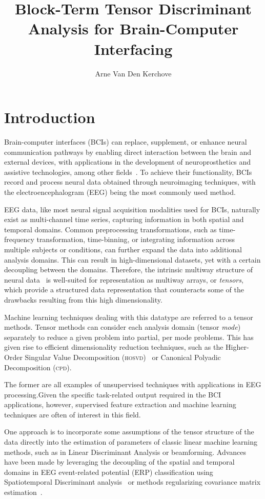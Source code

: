 \documentclass[twocolumn]{article}
\title{Block-Term Tensor Discriminant Analysis for Brain-Computer Interfacing}
\author{Arne Van Den Kerchove}
\begin{document}
\maketitle

\section{Introduction}
Brain-computer interfaces (BCIs) can replace, supplement, or enhance neural
communication pathways by enabling direct interaction between the brain and
external devices, with applications in the development of neuroprosthetics and
assistive technologies, among other fields~\cite{NicolasAlonso2012}.
To achieve their functionality, BCIs record and process neural data obtained
through neuroimaging techniques, with the electroencephalogram (EEG) being the
most commonly used method.

EEG data, like most neural signal acquisition modalities used for BCIs,
naturally exist as multi-channel time series, capturing information in both
spatial and temporal domains.
Common preprocessing transformations, such as time-frequency transformation,
time-binning, or integrating information across multiple subjects or conditions,
can further expand the data into additional analysis domains.
This can result in high-dimensional datasets, yet with a certain decoupling
between the domains.
Therefore, the intrinsic multiway structure of neural data~\cite{Erol2022} is
well-suited for representation as multiway arrays, or \emph{tensors}, which
provide a structured data representation that counteracts some of the drawbacks
resulting from this high dimensionality.

Machine learning techniques dealing with this datatype are referred to a tensor
methods.
Tensor methods can consider each analysis domain (tensor \emph{mode}) separately to
reduce a given problem into partial, per mode problems.
This has given rise to efficient dimensionality reduction techniques, such as
the Higher-Order Singular Value Decomposition
(\textsc{hosvd})~\cite{DeLathauwer2000,SoleCasals2018} or Canonical Polyadic Decomposition
(\textsc{cpd})\cite{Nazarpour2006}.

The former are all examples of unsupervised techniques with applications in EEG
processing.Given the specific task-related output required in the BCI applications, however,
supervised feature extraction and machine learning techniques are often of
interest in this field.

One approach is to incorporate some assumptions of the tensor structure of the
data directly into the estimation of parameters of classic linear machine
learning methods, such as in Linear Discriminant Analysis or beamforming.
Advances have been made by leveraging the decoupling of the spatial and temporal
domains in EEG event-related potential (ERP) classification using Spatiotemporal
Discriminant analysis~\cite{Li2010,Zhang2013} or methods regularizing covariance
matrix estimation~\cite{Kerchove2022,Sosulski2022}.
\end{document}
